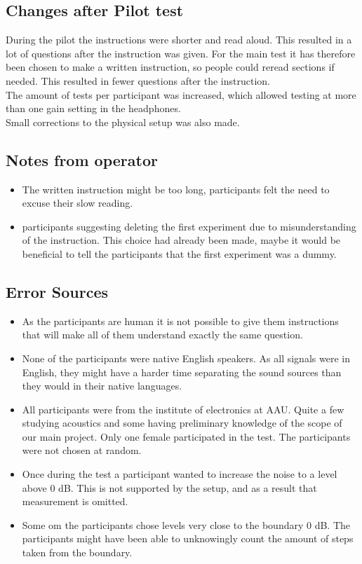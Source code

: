 \subsection{Changes after Pilot test}
During the pilot the instructions were shorter and read aloud. This resulted in a lot of questions after the instruction was given. For the main test it has therefore been chosen to make a written instruction, so people could reread sections if needed. This resulted in fewer questions after the instruction. \\
The amount of tests per participant was increased, which allowed testing at more than one gain setting in the headphones. \\
Small corrections to the physical setup was also made. 

\subsection{Notes from operator}
\begin{itemize}
\item The written instruction might be too long, participants felt the need to excuse their slow reading.
\item participants suggesting deleting the first experiment due to misunderstanding of the instruction. This choice had already been made, maybe it would be beneficial to tell the participants that the first experiment was a dummy. 
\end{itemize}

\subsection{Error Sources}
\begin{itemize}
\item As the participants are human it is not possible to give them instructions that will make all of them understand exactly the same question. 
\item None of the participants were native English speakers. As all signals were in English, they might have a harder time separating the sound sources than they would in their native languages. 
\item All participants were from the institute of electronics at AAU. Quite a few studying acoustics and some having preliminary knowledge of the scope of our main project. Only one female participated in the test. The participants were not chosen at random.  
\item Once during the test a participant wanted to increase the noise to a level above 0 dB. This is not supported by the setup, and as a result that measurement is omitted.
\item Some om the participants chose levels very close to the boundary 0 dB. The participants might have been able to unknowingly count the amount of steps taken from the boundary.  
\end{itemize}

